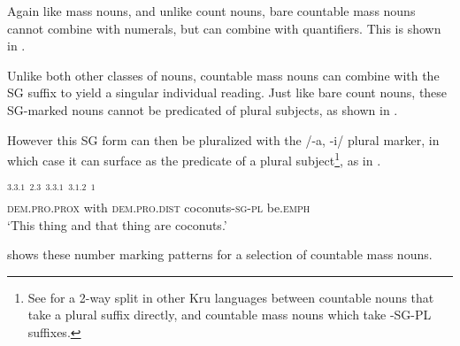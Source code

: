 \documentclass[output=paper,colorlinks,citecolor=brown]{langscibook}
\begin{document}
Again like mass nouns, and unlike count nouns, bare countable mass nouns cannot combine with numerals, but can combine with quantifiers. This is shown in .

\ea%
    \label{ex:sande:8}
    \z
\z

Unlike both other classes of nouns, countable mass nouns can combine with the SG suffix to yield a singular individual reading. Just like bare count nouns, these SG-marked nouns cannot be predicated of plural subjects, as shown in .

\z

However this SG form can then be pluralized with the /-a, -i/ plural marker, in which case it can surface as the predicate of a plural subject\footnote{See \cite[88-89]{Marchese1979} for a 2-way split in other Kru languages between countable nouns that take a plural suffix directly, and countable mass nouns which take -SG-PL suffixes.}, as in .

\ea%
    \label{ex:sande:10}
    \gll    {}$^{3.3.1}$ $^{2.3}$ $^{3.3.1}$ $^{3.1.2}$ $^{1}$\\
	        \textsc{dem.pro.prox} with \textsc{dem.pro.dist} coconuts\textsc{-sg-pl} be.\textsc{emph}\\
	\glt    `This thing and that thing are coconuts.'
\z

 shows these number marking patterns for a selection of countable mass nouns.
\end{document}
